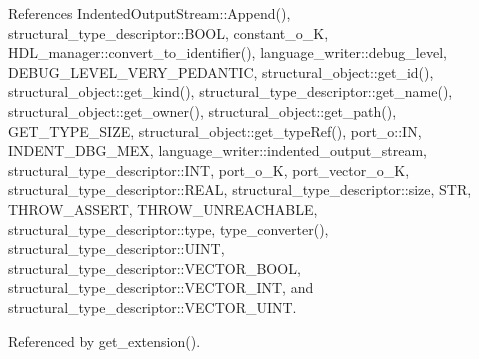 References Indented\+Output\+Stream\+::\+Append(), structural\+\_\+type\+\_\+descriptor\+::\+B\+O\+OL, constant\+\_\+o\+\_\+K, H\+D\+L\+\_\+manager\+::convert\+\_\+to\+\_\+identifier(), language\+\_\+writer\+::debug\+\_\+level, D\+E\+B\+U\+G\+\_\+\+L\+E\+V\+E\+L\+\_\+\+V\+E\+R\+Y\+\_\+\+P\+E\+D\+A\+N\+T\+IC, structural\+\_\+object\+::get\+\_\+id(), structural\+\_\+object\+::get\+\_\+kind(), structural\+\_\+type\+\_\+descriptor\+::get\+\_\+name(), structural\+\_\+object\+::get\+\_\+owner(), structural\+\_\+object\+::get\+\_\+path(), G\+E\+T\+\_\+\+T\+Y\+P\+E\+\_\+\+S\+I\+ZE, structural\+\_\+object\+::get\+\_\+type\+Ref(), port\+\_\+o\+::\+IN, I\+N\+D\+E\+N\+T\+\_\+\+D\+B\+G\+\_\+\+M\+EX, language\+\_\+writer\+::indented\+\_\+output\+\_\+stream, structural\+\_\+type\+\_\+descriptor\+::\+I\+NT, port\+\_\+o\+\_\+K, port\+\_\+vector\+\_\+o\+\_\+K, structural\+\_\+type\+\_\+descriptor\+::\+R\+E\+AL, structural\+\_\+type\+\_\+descriptor\+::size, S\+TR, T\+H\+R\+O\+W\+\_\+\+A\+S\+S\+E\+RT, T\+H\+R\+O\+W\+\_\+\+U\+N\+R\+E\+A\+C\+H\+A\+B\+LE, structural\+\_\+type\+\_\+descriptor\+::type, type\+\_\+converter(), structural\+\_\+type\+\_\+descriptor\+::\+U\+I\+NT, structural\+\_\+type\+\_\+descriptor\+::\+V\+E\+C\+T\+O\+R\+\_\+\+B\+O\+OL, structural\+\_\+type\+\_\+descriptor\+::\+V\+E\+C\+T\+O\+R\+\_\+\+I\+NT, and structural\+\_\+type\+\_\+descriptor\+::\+V\+E\+C\+T\+O\+R\+\_\+\+U\+I\+NT.



Referenced by get\+\_\+extension().

